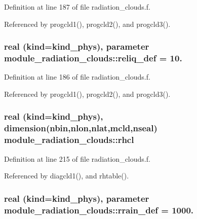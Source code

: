 Definition at line 187 of file radiation\+\_\+clouds.\+f.



Referenced by progcld1(), progcld2(), and progcld3().

\subsubsection[{\texorpdfstring{reliq\+\_\+def}{reliq_def}}]{\setlength{\rightskip}{0pt plus 5cm}real (kind=kind\+\_\+phys), parameter module\+\_\+radiation\+\_\+clouds\+::reliq\+\_\+def = 10.\hspace{0.3cm}{\ttfamily [private]}}\hypertarget{group__module__radiation__clouds_ga1768a85f4d8af2ad40b62ae6e6667c1e}{}\label{group__module__radiation__clouds_ga1768a85f4d8af2ad40b62ae6e6667c1e}


Definition at line 186 of file radiation\+\_\+clouds.\+f.



Referenced by progcld1(), progcld2(), and progcld3().

\subsubsection[{\texorpdfstring{rhcl}{rhcl}}]{\setlength{\rightskip}{0pt plus 5cm}real (kind=kind\+\_\+phys), dimension(nbin,nlon,nlat,mcld,nseal) module\+\_\+radiation\+\_\+clouds\+::rhcl\hspace{0.3cm}{\ttfamily [private]}}\hypertarget{group__module__radiation__clouds_ga9673faf82ef00e0501763664743e3720}{}\label{group__module__radiation__clouds_ga9673faf82ef00e0501763664743e3720}


Definition at line 215 of file radiation\+\_\+clouds.\+f.



Referenced by diagcld1(), and rhtable().

\subsubsection[{\texorpdfstring{rrain\+\_\+def}{rrain_def}}]{\setlength{\rightskip}{0pt plus 5cm}real (kind=kind\+\_\+phys), parameter module\+\_\+radiation\+\_\+clouds\+::rrain\+\_\+def = 1000.\hspace{0.3cm}{\ttfamily [private]}}\hypertarget{group__module__radiation__clouds_ga93fcaedae02c0f9c4de9f39061379d6b}{}\label{group__module__radiation__clouds_ga93fcaedae02c0f9c4de9f39061379d6b}


